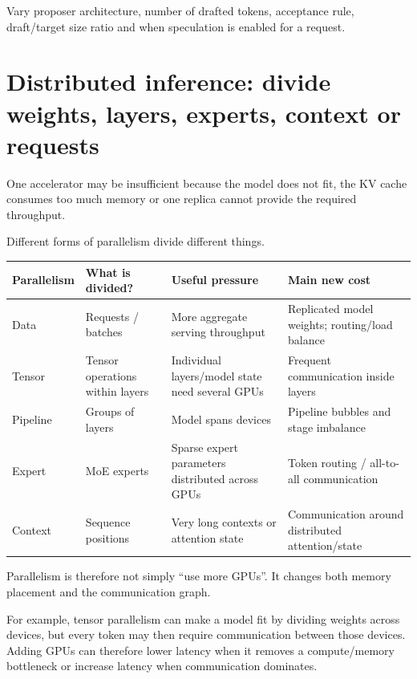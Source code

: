 \begin{calloutdegreeofexperiment}
Vary proposer architecture, number of drafted tokens, acceptance rule, draft/target size ratio and when speculation is enabled for a request.
\end{calloutdegreeofexperiment}


\section{Distributed inference: divide weights, layers, experts, context or requests}
\label{sec:inference-distributed}
One accelerator may be insufficient because the model does not fit, the KV cache consumes too much memory or one replica cannot provide the required throughput.

Different forms of parallelism divide different things.

\begin{center}
\small
\begin{tabularx}{.98\linewidth}{@{}L{.16\linewidth}L{.20\linewidth}YY@{}}
\toprule
\textbf{Parallelism} & \textbf{What is divided?} & \textbf{Useful pressure} & \textbf{Main new cost} \\
\midrule
Data
& Requests / batches
& More aggregate serving throughput
& Replicated model weights; routing/load balance \\
Tensor
& Tensor operations within layers
& Individual layers/model state need several GPUs
& Frequent communication inside layers \\
Pipeline
& Groups of layers
& Model spans devices
& Pipeline bubbles and stage imbalance \\
Expert
& MoE experts
& Sparse expert parameters distributed across GPUs
& Token routing / all-to-all communication \\
Context
& Sequence positions
& Very long contexts or attention state
& Communication around distributed attention/state \\
\bottomrule
\end{tabularx}
\end{center}

Parallelism is therefore not simply ``use more GPUs''.
It changes both memory placement and the communication graph.

For example, tensor parallelism can make a model fit by dividing weights across devices, but every token may then require communication between those devices.
Adding GPUs can therefore lower latency when it removes a compute/memory bottleneck or increase latency when communication dominates.


